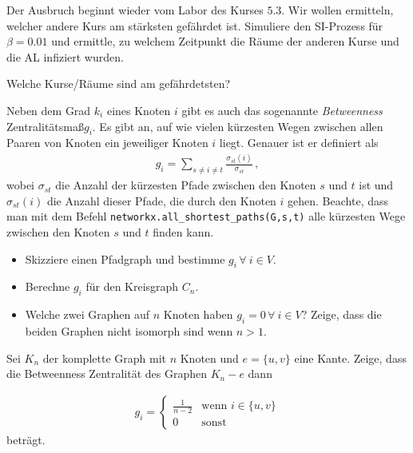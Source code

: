 \subexercise[%
  topic= Gef\"ahrdete Kurse,
    ]

Der Ausbruch beginnt wieder vom Labor des Kurses $5.3$. Wir wollen ermitteln, welcher andere Kurs am st\"arksten gef\"ahrdet ist. Simuliere den SI-Prozess f\"ur $\beta=0.01$ und ermittle, zu welchem Zeitpunkt die R\"aume der anderen Kurse und die AL infiziert wurden.

Welche Kurse/R\"aume sind am gef\"ahrdetsten? 

\exercise[%
  topic =  \emph{Betweenness} Zentralit\"at
    ]

Neben dem Grad $k_i$ eines Knoten $i$ gibt es auch das sogenannte \emph{Betweenness} Zentralit\"atsma\ss  $g_i$. Es gibt an, auf wie vielen k\"urzesten Wegen zwischen allen Paaren von Knoten ein jeweiliger Knoten $i$ liegt. Genauer ist er definiert als
\begin{align}
g_i = \sum_{s\neq i\neq t} \frac{\sigma_{st}(i)}{\sigma_{st}}\,,
\end{align}
wobei $\sigma_{st}$ die Anzahl der k\"urzesten Pfade zwischen den Knoten $s$ und $t$ ist und $\sigma_{st}(i)$ die Anzahl dieser Pfade, die durch den Knoten $i$ gehen. Beachte, dass man mit dem Befehl \texttt{networkx.all\_shortest\_paths(G,s,t)} alle k\"urzesten Wege zwischen den Knoten $s$ und $t$ finden kann.

\subexercise[%
  topic= Betweenness Zentralit\"at von bestimmten Graphen,
    ]

\begin{itemize}
\item Skizziere einen Pfadgraph und bestimme $g_i\,\forall\ i \in V$.
\item Berechne $g_i$ f\"ur den Kreisgraph $C_n$.
\item Welche zwei Graphen auf $n$ Knoten haben $g_i=0\,\forall\ i \in V$? Zeige, dass die beiden Graphen nicht isomorph sind wenn $n>1$.
\end{itemize}


\subexercise[%
  topic= Betweenness Zentralit\"at des Kompletten Graphen nach L\"oschung einer Kante,
    ]
		
Sei $K_n$ der komplette Graph mit $n$ Knoten und $e=\{u,v\}$ eine Kante. Zeige, dass die Betweenness Zentralit\"at des Graphen $K_n - e$ dann 

\begin{align}
g_i = \begin{cases} \frac{1}{n-2} &\mbox{wenn } i \in \{u,v\} \\ 
0 & \mbox{sonst } \end{cases} 
\end{align} 
betr\"agt.

